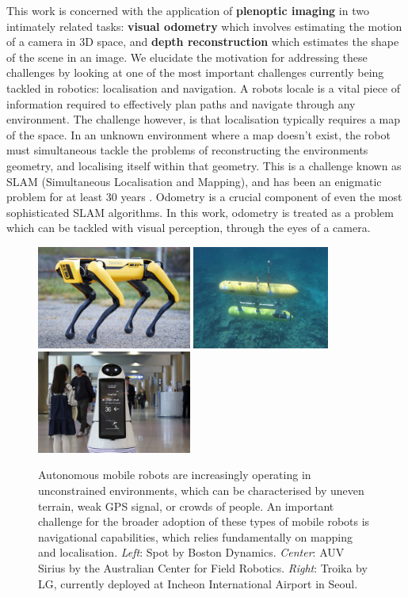 This work is concerned with the application of \textbf{plenoptic imaging} in two intimately related tasks: \textbf{visual odometry} which involves estimating the motion of a camera in 3D space, and \textbf{depth reconstruction} which estimates the shape of the scene in an image. We elucidate the motivation for addressing these challenges by looking at one of the most important challenges currently being tackled in robotics: localisation and navigation. A robots locale is a vital piece of information required to effectively plan paths and navigate through any environment. The challenge however, is that localisation typically requires a map of the space. In an unknown environment where a map doesn't exist, the robot must simultaneous tackle the problems of reconstructing the environments geometry, and localising itself within that geometry. This is a challenge known as SLAM (Simultaneous Localisation and Mapping), and has been an enigmatic problem for at least 30 years \cite{cadena2016slam, kuehefuss2016rgbdslam}. Odometry is a crucial component of even the most sophisticated SLAM algorithms. In this work, odometry is treated as a problem which can be tackled with visual perception, through the eyes of a camera. 

\begin{figure}[htbp]
    \includegraphics[height=1.33in]{images/spot.jpg}
    \includegraphics[height=1.33in]{images/rov_sirius.jpg}
    \includegraphics[height=1.33in]{images/troika.jpg}
    \caption[Examples of robots that operate in unconstrained spaces.]{Autonomous mobile robots are increasingly operating in unconstrained environments, which can be characterised by uneven terrain, weak GPS signal, or crowds of people. An important challenge for the broader adoption of these types of mobile robots is navigational capabilities, which relies fundamentally on mapping and localisation. \textit{Left}: Spot by Boston Dynamics. \textit{Center}: AUV Sirius by the Australian Center for Field Robotics. \textit{Right}: Troika by LG, currently deployed at Incheon International Airport in Seoul.}
\end{figure}


